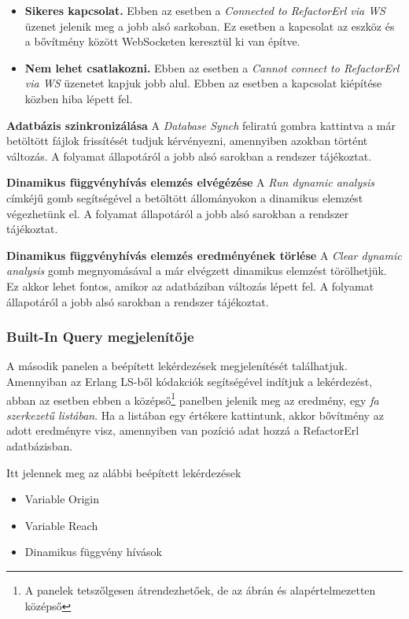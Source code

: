 \begin{itemize}
    \item \textbf{Sikeres kapcsolat.} Ebben az esetben a \textit{Connected to RefactorErl via WS} üzenet jelenik meg a jobb alsó sarkoban. Ez esetben a kapcsolat az eszköz és a bővítmény között WebSocketen keresztül ki van építve.
    \item \textbf{Nem lehet csatlakozni.} Ebben az esetben a \textit{Cannot connect to RefactorErl via WS} üzenetet kapjuk jobb alul. Ebben az esetben a kapcsolat kiépítése közben hiba lépett fel.
\end{itemize}

\vspace{5mm}
\noindent \textbf{Adatbázis szinkronizálása} 
A \textit{Database Synch} feliratú gombra kattintva a már betöltött fájlok frissítését tudjuk kérvényezni, amennyiben azokban történt változás. A folyamat állapotáról a jobb alsó sarokban a rendszer tájékoztat.

\vspace{5mm}
\noindent \textbf{Dinamikus függvényhívás elemzés elvégézése}
A \textit{Run dynamic analysis} címkéjű gomb segítségével a betöltött állományokon a dinamikus elemzést végezhetünk el. A folyamat állapotáról a jobb alsó sarokban a rendszer tájékoztat.

\vspace{5mm}
\noindent \textbf{Dinamikus függvényhívás elemzés eredményének törlése}
A \textit{Clear dynamic analysis} gomb megnyomásával a már elvégzett dinamikus elemzést törölhetjük. Ez akkor lehet fontos, amikor az adatbáziban változás lépett fel. A folyamat állapotáról a jobb alsó sarokban a rendszer tájékoztat.


\subsubsection{Built-In Query megjelenítője} \label{sectionVariable}

A második panelen a beépített lekérdezések megjelenítését találhatjuk. Amennyiban az Erlang LS-ből kódakciók segítségével indítjuk a lekérdezést, abban az esetben ebben a középső\footnote{A panelek tetszőlgesen átrendezhetőek, de az ábrán és alapértelmezetten középső} panelben jelenik meg az eredmény, egy \textit{fa szerkezetű listában}. Ha a listában egy értékere kattintunk, akkor bővítmény az adott eredményre visz, amennyiben van pozíció adat hozzá a RefactorErl adatbázisban.

\noindent Itt jelennek meg az alábbi beépített lekérdezések
\begin{itemize}
    \item Variable Origin
    \item Variable Reach
    \item Dinamikus függvény hívások
\end{itemize}

